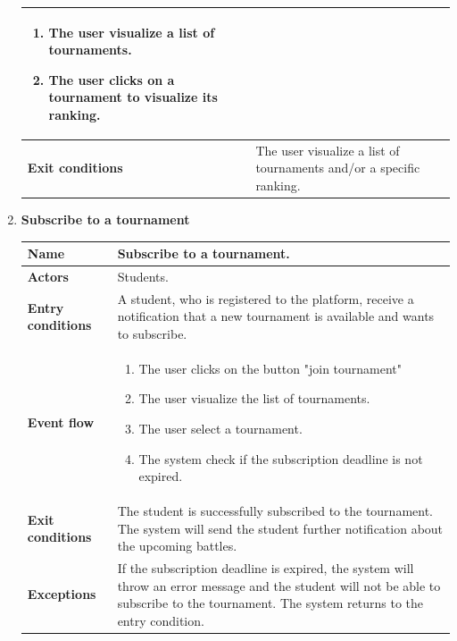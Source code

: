 \begin{enumerate}[label=\textbf{UC.\arabic*}]
\begin{table}[H]
\begin{tabular}{|m{3.2cm}|m{9.8cm}|}
\begin{enumerate}[label=\arabic*.]
                        \item The user visualize a list of tournaments.
                        \item The user clicks on a tournament to visualize its ranking.
                    \end{enumerate}\\
                    \hline
                    \textbf{Exit conditions}  & The user visualize a list of tournaments and/or a specific ranking. \\
                    \hline
                \end{tabular}
        \end{table}
        \item {} \textbf{Subscribe to a tournament}
        \begin{table}[H]
    	    \centering
                \renewcommand{\arraystretch}{1.5}
                \begin{tabular}{|m{3.2cm}|m{9.8cm}|}
                    \hline
                    \textbf{Name} & Subscribe to a tournament.\\
                    \hline
                    \textbf{Actors} & Students. \\
                    \hline
                    \textbf{Entry conditions}  & A student, who is registered to the platform, receive a notification that a new tournament is available and wants to subscribe.\\
                    \hline
                    \textbf{Event flow}  & 
                    \begin{enumerate}[label=\arabic*.]
                        \item The user clicks on the button "join tournament"
                        \item The user visualize the list of tournaments.
                        \item The user select a tournament.
                        \item The system check if the subscription deadline is not expired.
                    \end{enumerate}\\ 
                    \hline
                    \textbf{Exit conditions}  & The student is successfully subscribed to the tournament. The system will send the student further notification about the upcoming battles. \\
                    \hline
                    \textbf{Exceptions}  & If the subscription deadline is expired, the system will throw an error message and the student will not be able to subscribe to the tournament. The system returns to the entry condition. \\

\end{tabular}
\end{table}
\end{enumerate}
